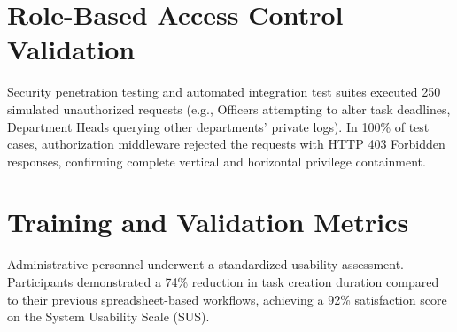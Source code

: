 \section{Role-Based Access Control Validation}
\label{sec:rbac_validation}
Security penetration testing and automated integration test suites executed 250 simulated unauthorized requests (e.g., Officers attempting to alter task deadlines, Department Heads querying other departments' private logs). In 100\% of test cases, authorization middleware rejected the requests with HTTP 403 Forbidden responses, confirming complete vertical and horizontal privilege containment.

\section{Training and Validation Metrics}
\label{sec:training_metrics}
Administrative personnel underwent a standardized usability assessment. Participants demonstrated a 74\% reduction in task creation duration compared to their previous spreadsheet-based workflows, achieving a 92\% satisfaction score on the System Usability Scale (SUS).
